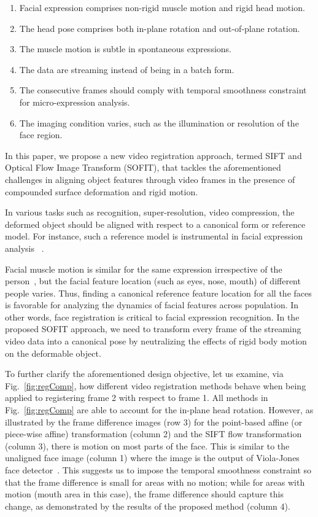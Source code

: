 \documentclass[review]{elsarticle}
\begin{document}
\begin{enumerate}
	\item Facial expression comprises non-rigid muscle motion and rigid head motion.
	\item The head pose comprises both in-plane rotation and out-of-plane rotation.
	\item The muscle motion is subtle in spontaneous expressions.
	\item The data are streaming instead of being in a batch form.
	\item The consecutive frames should comply with temporal smoothness constraint for micro-expression analysis.
	\item The imaging condition varies, such as the illumination or resolution of the face region.
\end{enumerate}

In this paper, we propose a new video registration approach, termed SIFT and Optical Flow Image Transform (SOFIT), that tackles the aforementioned challenges in aligning object features through video frames in the presence of compounded surface deformation and rigid motion.

In various tasks such as recognition, super-resolution, video compression, the deformed object should be aligned with respect to a canonical form or reference model.
For instance, such a reference model is instrumental in facial expression analysis ~\cite{Yang_SMCB12}.

Facial muscle motion is similar for the same expression irrespective of the person~\cite{Ekman78}, but the facial feature location (such as eyes, nose, mouth) of different people varies. Thus, finding a canonical reference feature location for all the faces is favorable for analyzing the dynamics of facial features across population. In other words, face registration is critical to facial expression recognition. In the proposed SOFIT approach, we need to transform every frame of the streaming video data into a canonical pose by neutralizing the effects of rigid body motion on the deformable object.

To further clarify the aforementioned design objective, let us examine, via Fig.~\ref{fig:regComp}, how different video registration methods behave when being applied to registering frame 2 with respect to frame 1.  All methods in Fig.~\ref{fig:regComp} are able to account for the in-plane head rotation. However, as illustrated by the frame difference images (row 3) for the point-based affine (or piece-wise affine) transformation (column 2) and the SIFT flow transformation (column 3), there is motion on most parts of the face. This is similar to the unaligned face image (column 1) where the image is the output of Viola-Jones face detector~\cite{Viola_IJCV04}. This suggests us to impose the temporal smoothness constraint so that the frame difference is small for areas with no motion; while for areas with motion (mouth area in this case), the frame difference should capture this change, as demonstrated by the results of the proposed method (column 4).
\end{document}

